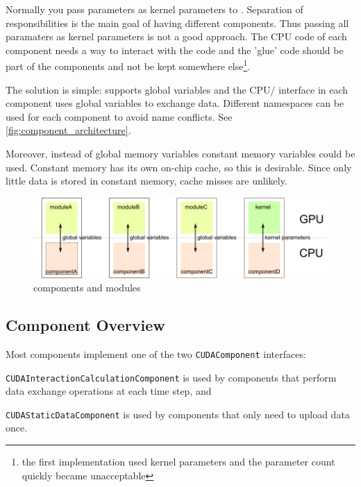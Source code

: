 Normally you pass parameters as kernel parameters to \cuda{}. Separation of responsibilities is the main goal of having different components. Thus passing all paramaters as kernel parameters is not a good approach. The CPU code of each component needs a way to interact with the \cuda{} code and the 'glue' code should be part of the components and not be kept somewhere else\footnote{the first implementation used kernel parameters and the parameter count quickly became unacceptable}.

The solution is simple: \cuda{} supports global variables and the CPU/\cuda{} interface in each component uses global variables to exchange data. Different namespaces can be used for each component to avoid name conflicts. See \autoref{fig:component_architecture}.

Moreover, instead of global memory variables constant memory variables could be used. Constant memory has its own on-chip cache, so this is desirable. Since only little data is stored in constant memory, cache misses are unlikely.

\begin{figure}
\includegraphics{figures/component_architecture.pdf}
\caption{components and \cuda{} modules}
\label{fig:component_architecture}
\end{figure}

\subsection{Component Overview}
Most components implement one of the two \lstinline!CUDAComponent! interfaces:
\begin{compactitem}
\item \lstinline!CUDAInteractionCalculationComponent! is used by components that perform data exchange operations at each time step, and
\item \lstinline!CUDAStaticDataComponent! is used by components that only need to upload data once.
\end{compactitem}

